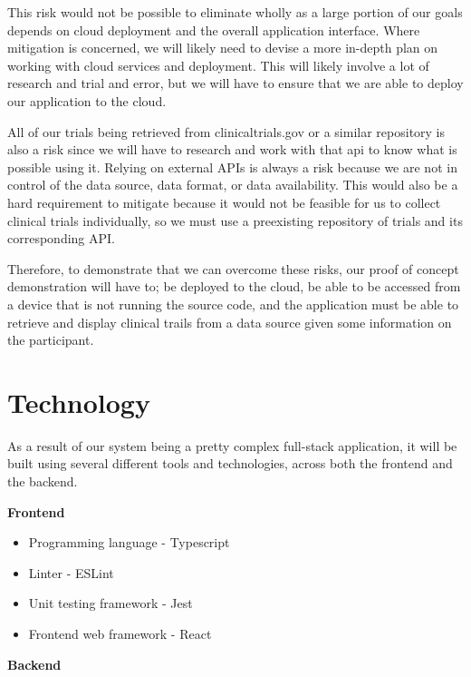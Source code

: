\documentclass{article}
\begin{document}
This risk would not be possible to eliminate wholly as a large portion of our goals depends on cloud deployment and the overall application interface. 
Where mitigation is concerned, we will likely need to devise a more in-depth plan on working with cloud services and deployment.
This will likely involve a lot of research and trial and error, but we will have to ensure that we are able to deploy our application to the cloud.

All of our trials being retrieved from clinicaltrials.gov or a similar repository is also a risk since we will have to 
research and work with that api to know what is possible using it. Relying on external APIs
is always a risk because we are not in control of the data source, data format, or data availability. 
This would also be a hard requirement to mitigate
because it would not be feasible for us to collect clinical trials individually, so we must use a preexisting repository of trials 
and its corresponding API. 

Therefore, to demonstrate that we can overcome these risks, our proof of concept demonstration will have to; 
be deployed to the cloud, be able to be accessed from a device that is not running the source code, 
and the application must be able to retrieve and display clinical trails from a data source given some information on the participant.

\section{Technology}

As a result of our system being a pretty complex full-stack application, it will be built
using several different tools and technologies, across both the frontend and the backend.
\begin{flushleft}
	\textbf{Frontend}	
\end{flushleft}

\begin{itemize}
	\item Programming language - Typescript
	\item Linter - ESLint
	\item Unit testing framework - Jest
	\item Frontend web framework - React
\end{itemize}

\begin{flushleft}
	\textbf{Backend}	
\end{flushleft}
\end{document}
